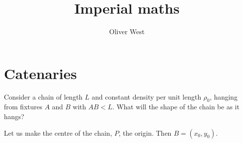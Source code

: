 \documentclass{../template/note}
\author{Oliver West}
\title{Imperial maths}
\date{}
\begin{document}
    
    \maketitle

    \tableofcontents


    \section{Catenaries}

    Consider a chain of length $L$ and constant density per unit length $\rho_0$, hanging from fixtures $A$ and $B$ with $AB < L$. What will the shape of the chain be as it hangs?

    Let us make the centre of the chain, $P$, the origin. Then $B = (x_0, y_0)$.
\end{document}
